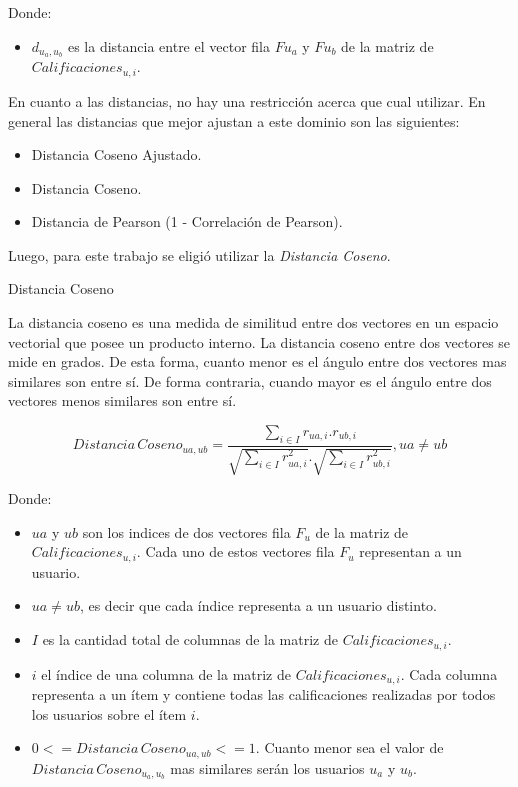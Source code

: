\documentclass[11pt,a4paper,twoside]{thesis}
\begin{document}
\begin{description}
	\item[Donde:]
\end{description}
\begin{itemize}
	\item $d_{u_a,u_b}$ es la distancia entre el vector fila $F{u_a}$ y $F{u_b}$ de la matriz de $Calificaciones_{u,i}$.
\end{itemize}

En cuanto a las distancias, no hay una restricción acerca que cual utilizar. En
general las distancias que mejor ajustan a este dominio son las siguientes:

\begin{itemize}
	\item Distancia Coseno Ajustado.
	\item Distancia Coseno.
	\item Distancia de Pearson (1 - Correlación de Pearson).
\end{itemize}

Luego, para este trabajo se eligió utilizar la \textit{Distancia Coseno}.

\begin{description}
	\item[Distancia Coseno]
\end{description}

La distancia coseno es una medida de similitud entre dos vectores en un espacio
vectorial que posee un producto interno. La distancia coseno entre dos vectores
se mide en grados. De esta forma, cuanto menor es el ángulo entre dos vectores
mas similares son entre sí. De forma contraria, cuando mayor es el ángulo entre
dos vectores menos similares son entre sí.

\begin{equation}
	Distancia \mspace{3mu}Coseno_{ua, ub} = \frac{ \sum_{i \in I} r_{ua, i}.r_{ub, i}}{\sqrt{\sum_{i \in I} r_{ua, i}^2}.\sqrt{\sum_{i \in I} r_{ub, i}^2}  }, ua \neq ub
\end{equation}

\begin{description}
	\item[Donde:]
\end{description}
\begin{itemize}
	\item $ua$ y $ub$ son los indices de dos vectores fila $F_u$ de la matriz de $Calificaciones_{u,i}$. Cada uno de estos vectores fila $F_u$ representan a un usuario.
	\item $ua \neq ub$, es decir que cada índice representa a un usuario distinto.
	\item $I$ es la cantidad total de columnas de la matriz de $Calificaciones_{u,i}$.
	\item $i$ el índice de una columna de la matriz de $Calificaciones_{u,i}$. Cada columna representa a un ítem y contiene todas las calificaciones realizadas por todos los usuarios sobre el ítem $i$.
	\item $0 <= Distancia \mspace{3mu} Coseno_{ua, ub} <= 1$. Cuanto menor sea el valor de $Distancia \mspace{3mu} Coseno_{u_a, u_b}$ mas similares serán los usuarios $u_a$ y $u_b$.
\end{itemize}
\end{document}
